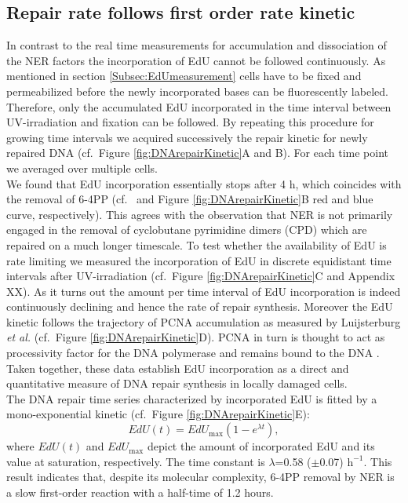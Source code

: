 \subsection{Repair rate follows first order rate kinetic}
\label{firstOrderRateKinetic}
In contrast to the real time measurements for accumulation and dissociation of the NER factors the incorporation of EdU cannot be followed continuously. As mentioned in section \ref{Subsec:EdUmeasurement} cells have to be fixed and permeabilized before the newly incorporated bases can be fluorescently labeled. Therefore, only the accumulated EdU incorporated in the time interval between UV-irradiation and fixation can be followed. By repeating this procedure for growing time intervals we acquired successively the repair kinetic for newly repaired DNA (cf.\ Figure \ref{fig:DNArepairKinetic}A and B). For each time point we averaged over multiple cells. \\
We found that EdU incorporation essentially stops after 4 h, which coincides with the removal of 6-4PP (cf.\ \cite{Luijsterburg2010} and Figure \ref{fig:DNArepairKinetic}B red and blue curve, respectively). This agrees with the observation that NER is not primarily engaged in the removal of cyclobutane pyrimidine dimers (CPD) which are repaired on a much longer timescale. To test whether the availability of EdU is rate limiting we measured the incorporation of EdU in discrete equidistant time intervals after UV-irradiation (cf.\ Figure \ref{fig:DNArepairKinetic}C and Appendix XX). As it turns out the amount per time interval of EdU incorporation is indeed continuously declining and hence the rate of repair synthesis. Moreover the EdU kinetic follows the trajectory of PCNA accumulation as measured by Luijsterburg \textit{et al.} \cite{Luijsterburg2010} (cf.\ Figure \ref{fig:DNArepairKinetic}D). PCNA in turn is thought to act as processivity factor for the DNA polymerase and remains bound to the DNA \cite{Luijsterburg2010,Essers2005,Sporbert2002}. Taken together, these data establish EdU incorporation as a direct and quantitative measure of DNA repair synthesis in locally damaged cells.\\
The DNA repair time series characterized by incorporated EdU is fitted by a mono-exponential kinetic (cf.\ Figure \ref{fig:DNArepairKinetic}E):
\begin{equation}
EdU(t) = EdU_\text{max}(1 - e^{\lambda t}),
\label{Eqn:EdU_kinetic}
\end{equation}  
where $EdU(t)$ and $EdU_{\text{max}}$ depict the amount of incorporated EdU and its value at saturation, respectively. The time constant is $\lambda$=0.58 ($\pm$0.07) $\text{h}^{-\text{1}}$. This result indicates that, despite its molecular complexity, 6-4PP removal by NER is a slow first-order reaction with a half-time of 1.2 hours.          
